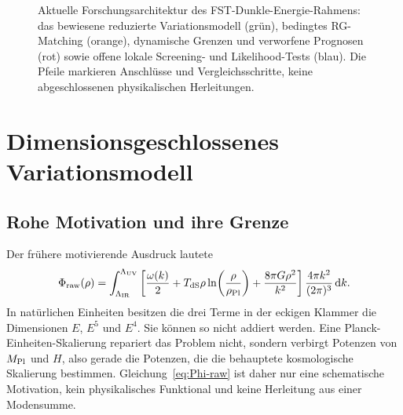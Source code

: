\documentclass[12pt,a4paper]{article}
\theoremstyle{definition}
\theoremstyle{plain}
\theoremstyle{remark}
\newcommand{\LUV}{\Lambda_{\mathrm{UV}}}
\newcommand{\LIR}{\Lambda_{\mathrm{IR}}}
\newcommand{\dd}{\mathrm{d}}
\begin{document}
\begin{figure}[htbp]
{%
}
\caption{Aktuelle Forschungsarchitektur des FST-Dunkle-Energie-Rahmens: das bewiesene reduzierte Variationsmodell (grün), bedingtes RG-Matching (orange), dynamische Grenzen und verworfene Prognosen (rot) sowie offene lokale Screening- und Likelihood-Tests (blau). Die Pfeile markieren Anschlüsse und Vergleichsschritte, keine abgeschlossenen physikalischen Herleitungen.}
\label{fig:epistemische_architektur}\label{fig:epistemic_architecture}
\end{figure}

\section{Dimensionsgeschlossenes Variationsmodell}\label{sec:functional}

\subsection{Rohe Motivation und ihre Grenze}

Der frühere motivierende Ausdruck lautete
\begin{equation}\label{eq:Phi-raw}
 \Phi_{\rm raw}(\rho)=
 \int_{\LIR}^{\LUV}
 \left[
 \frac{\omega(k)}{2}
 +T_{\rm dS}\rho\ln\!\left(\frac{\rho}{\rho_{\rm Pl}}\right)
 +\frac{8\pi G\rho^2}{k^2}
 \right]\frac{4\pi k^2}{(2\pi)^3}\,\dd k .
\end{equation}
In natürlichen Einheiten besitzen die drei Terme in der eckigen Klammer die
Dimensionen \(E\), \(E^5\) und \(E^4\). Sie können so nicht addiert werden.
Eine Planck-Einheiten-Skalierung repariert das Problem nicht, sondern verbirgt
Potenzen von \(M_{\rm Pl}\) und \(H\), also gerade die Potenzen, die die
behauptete kosmologische Skalierung bestimmen. Gleichung~\eqref{eq:Phi-raw}
ist daher nur eine schematische Motivation, kein physikalisches Funktional und
keine Herleitung aus einer Modensumme.
\end{document}
